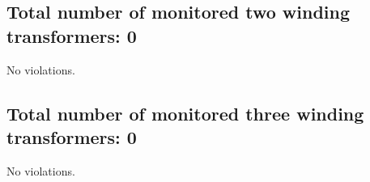 \documentclass{article}%
\begin{document}
%
\subsection*{Total number of monitored two winding transformers: 0}%
\label{subsec:Totalnumberofmonitoredtwowindingtransformers0}%
No violations.

%
\subsection*{Total number of monitored three winding transformers: 0}%
\label{subsec:Totalnumberofmonitoredthreewindingtransformers0}%
No violations.

%
\end{document}

